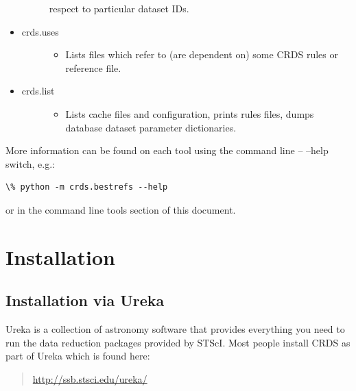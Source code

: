 \documentclass[letterpaper,10pt,english]{sphinxmanual}
\begin{document}
\begin{itemize}
\begin{description}
\begin{itemize}
\end{itemize}

respect to particular dataset IDs.

\end{description}

\item {} \begin{description}
\item[{crds.uses}] \leavevmode\begin{itemize}
\item {} 
Lists files which refer to (are dependent on) some CRDS rules or reference file.

\end{itemize}

\end{description}

\item {} \begin{description}
\item[{crds.list}] \leavevmode\begin{itemize}
\item {} 
Lists cache files and configuration,  prints rules files,  dumps database dataset parameter dictionaries.

\end{itemize}

\end{description}

\end{itemize}

More information can be found on each tool using the command line -- --help switch,  e.g.:

\begin{Verbatim}[commandchars=\\\{\}]
\% python -m crds.bestrefs --help
\end{Verbatim}

or in the command line tools section of this document.


\chapter{Installation}
\label{installation:installation}

\section{Installation via Ureka}
\label{installation:installation-via-ureka}
Ureka is a collection of astronomy software that provides everything you need to run the data reduction packages
provided by STScI.   Most people install CRDS as part of Ureka which is found here:
\begin{quote}

\href{http://ssb.stsci.edu/ureka/}{http://ssb.stsci.edu/ureka/}
\end{quote}
\end{document}
